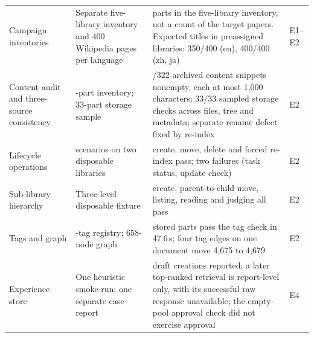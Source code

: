 \documentclass[final,5p,times,twocolumn]{elsarticle}
\begin{document}
\begin{table}[t]
\begin{tabular}{@{}>{\raggedright\arraybackslash}p{}>{\raggedright\arraybackslash}p{}>{\raggedright\arraybackslash}p{}>{\raggedright\arraybackslash}p{}@{}}
Campaign inventories & Separate five-library inventory and 400 Wikipedia pages per language & 322 parts in the five-library inventory, not a count of the target papers. Expected titles in preassigned libraries: 350/400 (en), 400/400 (zh, ja) & E1--E2\\
Content audit and three-source consistency & 322-part inventory; 33-part storage sample & 322/322 archived content snippets nonempty, each at most 1,000 characters; 33/33 sampled storage checks across files, tree and metadata; separate rename defect fixed by re-index & E2\\
Lifecycle operations & 16 scenarios on two disposable libraries & create, move, delete and forced re-index pass; two failures (task status, update check) & E2\\
Sub-library hierarchy & Three-level disposable fixture & create, parent-to-child move, listing, reading and judging all pass & E2\\
Tags and graph & 316-tag registry; 658-node graph & 165 stored parts pass the tag check in 47.6\,s; four tag edges on one document move 4{,}675 to 4{,}679 & E2\\
Experience store & One heuristic smoke run; one separate case report & 13 draft creations reported; a later top-ranked retrieval is report-level only, with its successful raw response unavailable; the empty-pool approval check did not exercise approval & E4\\
\bottomrule
\end{tabular}
\end{table}
\end{document}

